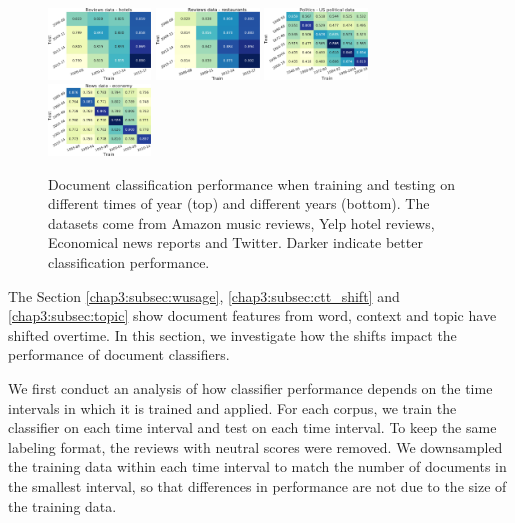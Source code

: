 \begin{figure}[tb!]
\includegraphics[width=0.244\textwidth]{images/chapter3/acl2018/year_hotel}
\includegraphics[width=0.244\textwidth]{images/chapter3/acl2018/year_rest}
\includegraphics[width=0.244\textwidth]{images/chapter3/acl2018/year_parties}
\includegraphics[width=0.244\textwidth]{images/chapter3/acl2018/year_economy}
\caption{\label{chap3:fig:time} Document classification performance when training and testing on different times of year (top) and different years (bottom). The datasets come from Amazon music reviews, Yelp hotel reviews, Economical news reports and Twitter. Darker indicate better classification performance.}
\end{figure}

The Section \ref{chap3:subsec:wusage}, \ref{chap3:subsec:ctt_shift} and \ref{chap3:subsec:topic} show document features from word, context and topic have shifted overtime. In this section, we investigate how the shifts impact the performance of document classifiers.

We first conduct an analysis of how classifier performance depends on the time intervals in which it is trained and applied.
For each corpus, we train the classifier on each time interval and test on each time interval.
To keep the same labeling format, the reviews with neutral scores were removed.
We downsampled the training data within each time interval to match the number of documents in the smallest interval, so that differences in performance are not due to the size of the training data.

